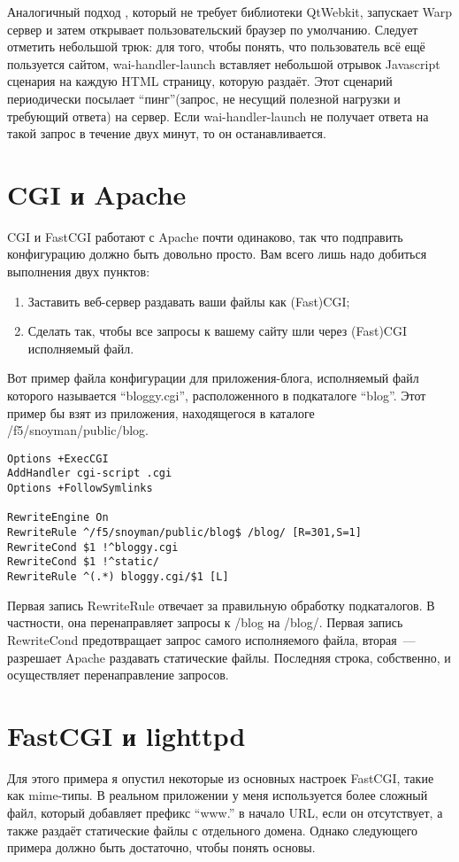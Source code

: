 Аналогичный подход
,
который не требует библиотеки QtWebkit, запускает Warp сервер и затем открывает
пользовательский браузер по умолчанию. Следует отметить небольшой трюк: для
того, чтобы понять, что пользователь всё ещё пользуется сайтом,
wai-handler-launch вставляет небольшой отрывок Javascript сценария на каждую
HTML страницу, которую раздаёт. Этот сценарий периодически посылает
``пинг''(запрос, не несущий полезной нагрузки и требующий ответа) на сервер.
Если wai-handler-launch не получает ответа на такой запрос в течение двух
минут, то он останавливается.

\section{CGI и Apache}
CGI и FastCGI работают с Apache почти одинаково, так что подправить
конфигурацию должно быть довольно просто. Вам всего лишь надо добиться
выполнения двух пунктов:
\begin{enumerate}
  \item Заставить веб-сервер раздавать ваши файлы как (Fast)CGI;

  \item Сделать так, чтобы все запросы к вашему сайту шли через (Fast)CGI
      исполняемый файл.
\end{enumerate}

Вот пример файла конфигурации для приложения-блога, исполняемый файл которого
называется ``bloggy.cgi'', расположенного в подкаталоге ``blog''. Этот пример
бы взят из приложения, находящегося в каталоге /f5/snoyman/public/blog.

\begin{lstlisting}
Options +ExecCGI
AddHandler cgi-script .cgi
Options +FollowSymlinks

RewriteEngine On
RewriteRule ^/f5/snoyman/public/blog$ /blog/ [R=301,S=1]
RewriteCond $1 !^bloggy.cgi
RewriteCond $1 !^static/
RewriteRule ^(.*) bloggy.cgi/$1 [L]
\end{lstlisting}

Первая запись RewriteRule отвечает за правильную обработку подкаталогов. В
частности, она перенаправляет запросы к /blog на /blog/. Первая запись
RewriteCond предотвращает запрос самого исполняемого файла, вторая~---
разрешает Apache раздавать статические файлы. Последняя строка, собственно, и
осуществляет перенаправление запросов.

\section{FastCGI и lighttpd}
Для этого примера я опустил некоторые из основных настроек FastCGI, такие как
mime-типы. В реальном приложении у меня используется более сложный файл,
который добавляет префикс ``www.'' в начало URL, если он отсутствует, а также
раздаёт статические файлы с отдельного домена. Однако следующего примера должно
быть достаточно, чтобы понять основы.


